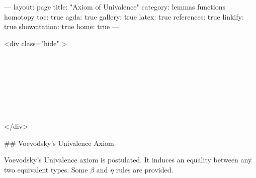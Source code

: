 ---
layout: page
title: "Axiom of Univalence"
category: lemmas functions homotopy
toc: true
agda: true
gallery: true
latex: true
references: true
linkify: true
showcitation: true
home: true
---

<div class="hide" >
\begin{code}%
\>[0]\AgdaSymbol{\{-\#}\AgdaSpace{}%
\AgdaSpace{}%
\AgdaSpace{}%
\AgdaSymbol{\#-\}}\<%
\\
\>[0]\AgdaSpace{}%
\AgdaSpace{}%
\<%
\\
\>[0]\AgdaSpace{}%
\AgdaSpace{}%
\<%
\\
%
\\[\AgdaEmptyExtraSkip]%
\>[0]\AgdaSpace{}%
\AgdaSpace{}%
\<%
\\
\>[0]\AgdaSpace{}%
\AgdaSpace{}%
\<%
\\
\>[0]\AgdaSpace{}%
\AgdaSpace{}%
\<%
\end{code}
</div>

## Voevodsky's Univalence Axiom

Voevodsky's Univalence axiom is postulated. It induces an equality between any
two equivalent types. Some $β$ and $η$ rules are provided.

\begin{code}%
\>[0]\AgdaSpace{}%
\AgdaSpace{}%
\AgdaSymbol{\{}\AgdaSymbol{\}}\AgdaSpace{}%
\AgdaSymbol{\{}\AgdaSpace{}%
\AgdaSpace{}%
\AgdaSymbol{:}\AgdaSpace{}%
\AgdaSpace{}%
\AgdaSymbol{\}}\AgdaSpace{}%
\<%
\end{code}

